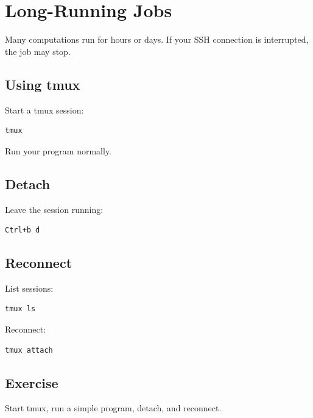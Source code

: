 \section{Long-Running Jobs}

Many computations run for hours or days. If your SSH connection is interrupted, the job may stop.

\subsection{Using tmux}

Start a tmux session:

\begin{lstlisting}
tmux
\end{lstlisting}

Run your program normally.

\subsection{Detach}

Leave the session running:

\begin{lstlisting}
Ctrl+b d
\end{lstlisting}

\subsection{Reconnect}

List sessions:

\begin{lstlisting}
tmux ls
\end{lstlisting}

Reconnect:

\begin{lstlisting}
tmux attach
\end{lstlisting}

\subsection{Exercise}

Start tmux, run a simple program, detach, and reconnect.
